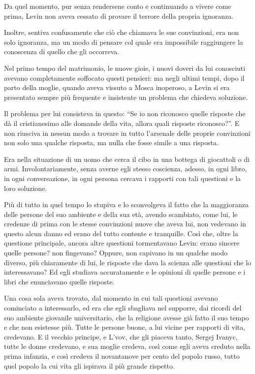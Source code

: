 Da quel momento, pur senza rendersene conto e continuando a vivere come prima, Levin non aveva cessato di provare il terrore della propria ignoranza. 

Inoltre, sentiva confusamente che ciò che chiamava le sue convinzioni, era non solo ignoranza, ma un modo di pensare col quale era impossibile raggiungere la conoscenza di quello che gli occorreva. 

Nel primo tempo del matrimonio, le nuove gioie, i nuovi doveri da lui conosciuti avevano completamente soffocato questi pensieri: ma negli ultimi tempi, dopo il parto della moglie, quando aveva vissuto a Mosca inoperoso, a Levin si era presentato sempre più frequente e insistente un problema che chiedeva soluzione. 

Il problema per lui consisteva in questo: ``Se io non riconosco quelle risposte che dà il cristianesimo alle domande della vita, allora quali risposte riconosco?''. E non riusciva in nessun modo a trovare in tutto l'arsenale delle proprie convinzioni non solo una qualche risposta, ma nulla che fosse simile a una risposta. 

Era nella situazione di un uomo che cerca il cibo in una bottega di giocattoli o di armi. Involontariamente, senza averne egli stesso coscienza, adesso, in ogni libro, in ogni conversazione, in ogni persona cercava i rapporti con tali questioni e la loro soluzione. 

Più di tutto in quel tempo lo stupiva e lo sconvolgeva il fatto che la maggioranza delle persone del suo ambiente e della sua età, avendo scambiato, come lui, le credenze di prima con le stesse convinzioni nuove che aveva lui, non vedevano in questo alcun danno ed erano del tutto contente e tranquille. Così che, oltre la questione principale, ancora altre questioni tormentavano Levin: erano sincere quelle persone? non fingevano? Oppure, non capivano in un qualche modo diverso, più chiaramente di lui, le risposte che dava la scienza alle questioni che lo interessavano? Ed egli studiava accuratamente e le opinioni di quelle persone e i libri che enunciavano quelle risposte. 

Una cosa sola aveva trovato, dal momento in cui tali questioni avevano cominciato a interessarlo, ed era che egli sbagliava nel supporre, dai ricordi del suo ambiente giovanile universitario, che la religione avesse già fatto il suo tempo e che non esistesse più. Tutte le persone buone, a lui vicine per rapporti di vita, credevano. E il vecchio principe, e L'vov, che gli piaceva tanto, Sergej Ivanyc, tutte le donne credevano, e sua moglie credeva, così come egli aveva creduto nella prima infanzia, e così credeva il novantanove per cento del popolo russo, tutto quel popolo la cui vita gli ispirava il più grande rispetto. 

